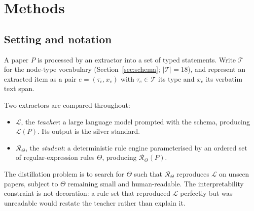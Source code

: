 %
%

\section{Methods}
\label{sec:methods}

\subsection{Setting and notation}
\label{sec:notation}

A paper $P$ is processed by an extractor into a set of typed statements. Write
$\mathcal{T}$ for the node-type vocabulary (Section~\ref{sec:schema};
$|\mathcal{T}| = 18$), and represent an extracted item as a pair
$e = (\tau_e, x_e)$ with $\tau_e \in \mathcal{T}$ its type and $x_e$ its
verbatim text span.

Two extractors are compared throughout:

\begin{itemize}
  \item $\mathcal{L}$, the \emph{teacher}: a large language model prompted with
    the schema, producing $\mathcal{L}(P)$. Its output is the silver standard.
  \item $\mathcal{R}_\Theta$, the \emph{student}: a deterministic rule engine
    parameterised by an ordered set of regular-expression rules $\Theta$,
    producing $\mathcal{R}_\Theta(P)$.
\end{itemize}

The distillation problem is to search for $\Theta$ such that
$\mathcal{R}_\Theta$ reproduces $\mathcal{L}$ on unseen papers, subject to
$\Theta$ remaining small and human-readable. The interpretability constraint is
not decoration: a rule set that reproduced $\mathcal{L}$ perfectly but was
unreadable would restate the teacher rather than explain it.

